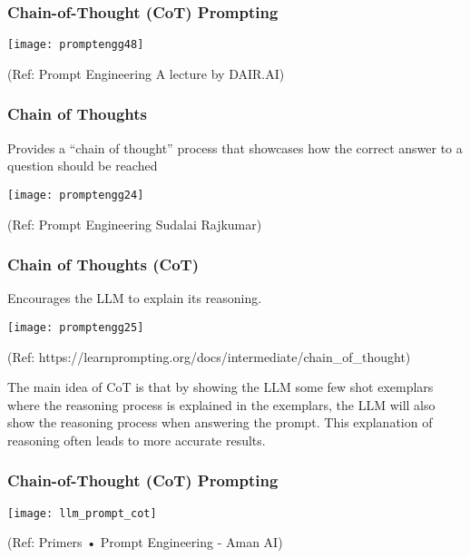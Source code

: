 \begin{frame}[fragile]\frametitle{Chain-of-Thought (CoT) Prompting}

\begin{center}
\texttt{[image: promptengg48]}

{\tiny (Ref: Prompt Engineering A lecture by DAIR.AI)}

\end{center}	

\end{frame}



\begin{frame}[fragile]\frametitle{Chain of Thoughts}

Provides a “chain of thought” process that 
showcases how the correct answer to a question should be reached

\begin{center}
\texttt{[image: promptengg24]}

{\tiny (Ref: Prompt Engineering Sudalai Rajkumar)}

\end{center}		

\end{frame}

\begin{frame}[fragile]\frametitle{Chain of Thoughts (CoT)}

Encourages the LLM to explain its reasoning. 

\begin{center}
\texttt{[image: promptengg25]}

{\tiny (Ref: https://learnprompting.org/docs/intermediate/chain\_of\_thought)}

\end{center}		

The main idea of CoT is that by showing the LLM some few shot exemplars where the reasoning process is explained in the exemplars, the LLM will also show the reasoning process when answering the prompt. This explanation of reasoning often leads to more accurate results.

\end{frame}




\begin{frame}[fragile]\frametitle{Chain-of-Thought (CoT) Prompting}


\begin{center}
\texttt{[image: llm\_prompt\_cot]}

{\tiny (Ref: Primers • Prompt Engineering - Aman AI)}

\end{center}				
			

\end{frame}

